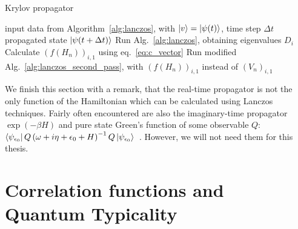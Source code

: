 \begin{algorithm}
	\algrenewcommand{}
	\algrenewcommand{}
	\caption{Krylov propagator}
	\label{alg:krylov_propagator}
	\begin{algorithmic}[1]
		\Require input data from Algorithm~\ref{alg:lanczos}, with \(\ket{v} = \ket{\psi(t)}\), time step \(\Delta t\)
		\Ensure propagated state \(\ket{\psi(t+\Delta t)}\)
		\State Run Alg.~\ref{alg:lanczos}, obtaining eigenvalues \(D_i\)
		\State Calculate \(\left(f(H_n)\right)_{i,1}\) using eq.~\eqref{eq:c_vector}
		\State Run modified Alg.~\ref{alg:lanczos_second_pass}, with \(\left(f(H_n)\right)_{i,1}\) instead of \(\left(V_n\right)_{i,1}\)
	\end{algorithmic}
\end{algorithm}

We finish this section with a remark, that the real-time propagator is not the only function of the Hamiltonian which can
be calculated using Lanczos techniques. Fairly often encountered are also the imaginary-time propagator \(\exp\left(-\beta H\right)\)
and pure state Green's function of some observable \(Q\): \(\bra{\psi_{\epsilon_0}} Q \left(\omega + i\eta +\epsilon_0
+ H \right)^{-1} Q \ket{\psi_{\epsilon_0}}\)~\autocite{Dagotto1994}. However, we will not need them for this thesis.


\section{Correlation functions and Quantum Typicality}

